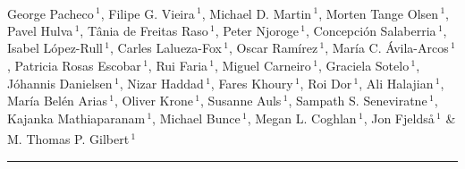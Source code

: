 \documentclass[twoside, british, a4paper]{article}
\newcommand\myhline{%
  \noindent\rule[.5pt]{\linewidth}{.4pt}\par%
}
\begin{document}
\thispagestyle{empty}

\LARGE{\bfseries{\color[rgb]{0.25,0.25,0.25}}} \\

 \small \noindent 
George Pacheco\,$^{1}$\textsuperscript{\faEnvelopeO},
Filipe G. Vieira\,$^{1}$,
Michael D. Martin\,$^{1}$,
Morten Tange Olsen\,$^{1}$,
Pavel Hulva\,$^{1}$,
Tânia de Freitas Raso\,$^{1}$,
Peter Njoroge\,$^{1}$,
Concepción Salaberria\,$^{1}$,
Isabel López-Rull\,$^{1}$,
Carles Lalueza-Fox\,$^{1}$,
Oscar Ramírez\,$^{1}$,
María C. Ávila-Arcos\,$^{1}$,
Patricia Rosas Escobar\,$^{1}$,
Rui Faria\,$^{1}$,
Miguel Carneiro\,$^{1}$,
Graciela Sotelo\,$^{1}$,
Jóhannis Danielsen\,$^{1}$,
Nizar Haddad\,$^{1}$,
Fares Khoury\,$^{1}$,
Roi Dor\,$^{1}$,
Ali Halajian\,$^{1}$,
María Belén Arias\,$^{1}$,
Oliver Krone\,$^{1}$,
Susanne Auls\,$^{1}$,
Sampath S. Seneviratne\,$^{1}$,
Kajanka Mathiaparanam\,$^{1}$,
Michael Bunce\,$^{1}$,
Megan L. Coghlan\,$^{1}$,
Jon Fjeldså\,$^{1}$ \&
M. Thomas P. Gilbert\,$^{1}$\textsuperscript{\faEnvelopeO} \\
\myhline
\end{document}
